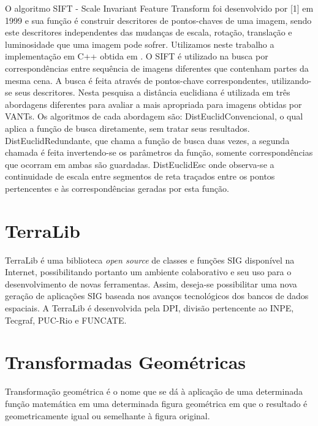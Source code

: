 \documentclass[9pt, a4paper, nofonttune, journal]{IEEEtran}
\begin{document}
O algoritmo SIFT - Scale Invariant Feature Transform foi desenvolvido por [1] em 1999 e sua função é construir descritores de pontos-chaves de uma imagem,
 sendo este descritores independentes das mudanças de escala, rotação, translação e luminosidade que uma imagem pode sofrer.
Utilizamos neste trabalho a implementação em C++ obtida em \cite{Vedaldi}.
O SIFT é utilizado na busca por correspondências entre sequência de imagens diferentes que contenham partes da mesma cena. 
A busca é feita através de pontos-chave correspondentes, utilizando-se seus descritores. 
Nesta pesquisa a distância euclidiana é utilizada em três abordagens diferentes para avaliar a mais apropriada para imagens obtidas por VANTs. 
Os algoritmos de cada abordagem são: DistEuclidConvencional, o qual aplica a função de busca diretamente, sem tratar seus resultados. 
DistEuclidRedundante, que chama a função de busca duas vezes, a segunda chamada é feita invertendo-se os parâmetros da função, 
somente correspondências que ocorram em ambas são guardadas. 
DistEuclidEsc onde observa-se a continuidade de escala entre segmentos de reta traçados entre os pontos pertencentes e às correspondências geradas 
por esta função.


\clearpage

\section{TerraLib}
\PARstart TerraLib é uma biblioteca \textit{open source} de classes e funções SIG disponível na Internet, possibilitando portanto um ambiente colaborativo e seu uso
para o desenvolvimento de novas ferramentas. Assim, deseja-se possibilitar uma nova geração de aplicações SIG baseada nos avanços tecnológicos dos bancos de dados espaciais.
A TerraLib é desenvolvida pela DPI, divisão pertencente ao INPE, Tecgraf, PUC-Rio e FUNCATE.\cite{Terralib1}


\section{Transformadas Geométricas}
\PARstart Transformação geométrica é o nome que se dá à aplicação de uma determinada função matemática em uma determinada figura geométrica 
em que o resultado é geometricamente igual ou semelhante à figura original.
\end{document}
